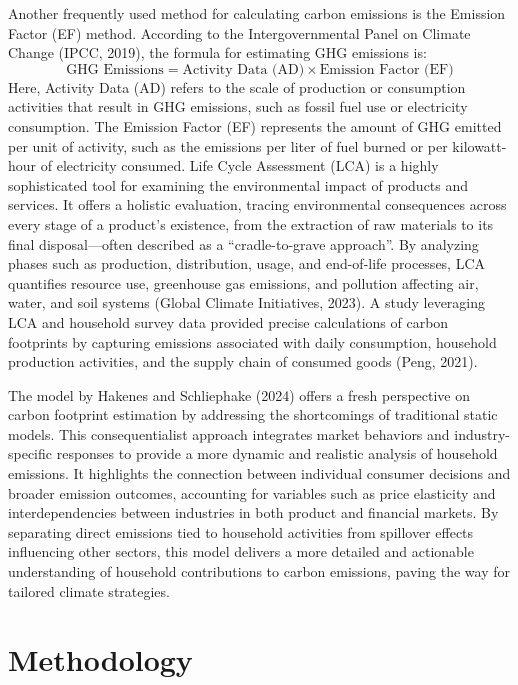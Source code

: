 \documentclass[12pt,a4paper]{article}%
\begin{document}
Another frequently used method for calculating carbon emissions is the Emission Factor (EF) method. According to the Intergovernmental Panel on Climate Change (IPCC, 2019), the formula for estimating GHG emissions is:
\[
\text{GHG Emissions} = \text{Activity Data (AD)} \times \text{Emission Factor (EF)}
\]
Here, Activity Data (AD) refers to the scale of production or consumption activities that result in GHG emissions, such as fossil fuel use or electricity consumption. The Emission Factor (EF) represents the amount of GHG emitted per unit of activity, such as the emissions per liter of fuel burned or per kilowatt-hour of electricity consumed. Life Cycle Assessment (LCA) is a highly sophisticated tool for examining the environmental impact of products and services. It offers a holistic evaluation, tracing environmental consequences across every stage of a product's existence, from the extraction of raw materials to its final disposal—often described as a ``cradle-to-grave approach''. By analyzing phases such as production, distribution, usage, and end-of-life processes, LCA quantifies resource use, greenhouse gas emissions, and pollution affecting air, water, and soil systems (Global Climate Initiatives, 2023). A study leveraging LCA and household survey data provided precise calculations of carbon footprints by capturing emissions associated with daily consumption, household production activities, and the supply chain of consumed goods (Peng, 2021).

\vspace{5pt}

The model by Hakenes and Schliephake (2024) offers a fresh perspective on carbon footprint estimation by addressing the shortcomings of traditional static models. This consequentialist approach integrates market behaviors and industry-specific responses to provide a more dynamic and realistic analysis of household emissions. It highlights the connection between individual consumer decisions and broader emission outcomes, accounting for variables such as price elasticity and interdependencies between industries in both product and financial markets. By separating direct emissions tied to household activities from spillover effects influencing other sectors, this model delivers a more detailed and actionable understanding of household contributions to carbon emissions, paving the way for tailored climate strategies.


\section{Methodology}
\lipsum[3-4]
\end{document}
